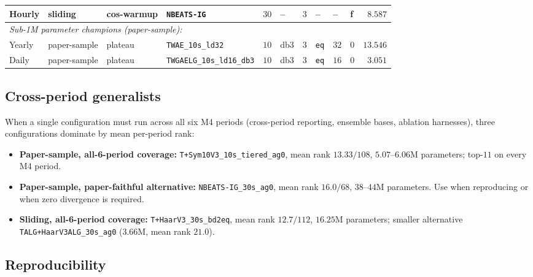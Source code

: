 \documentclass{article}
\begin{document}
\begin{table}[h]
\begin{tabular}{@{}llllllllllr@{}}
Hourly    & sliding      & cos-warmup & \texttt{NBEATS-IG}                  & $30$ & --    & $3$ & --             & --   & f & $\phantom{0}8.587$ \\
\midrule
\multicolumn{11}{l}{\textit{Sub-1M parameter champions (paper-sample):}} \\
Yearly    & paper-sample & plateau & \texttt{TWAE\_10s\_ld32}             & $10$ & db3   & $3$ & \texttt{eq} & $32$ & 0 & $13.546$ \\
Daily     & paper-sample & plateau & \texttt{TWGAELG\_10s\_ld16\_db3}     & $10$ & db3   & $3$ & \texttt{eq} & $16$ & 0 & $\phantom{0}3.051$ \\
\bottomrule
\end{tabular}
\end{table}

\subsection{Cross-period generalists}
\label{app:hyperparams:generalist}

When a single configuration must run across all six M4 periods (cross-period reporting, ensemble bases, ablation harnesses), three configurations dominate by mean per-period rank:

\begin{itemize}\itemsep -1pt
\item \textbf{Paper-sample, all-6-period coverage:} \texttt{T+Sym10V3\_10s\_tiered\_ag0}, mean rank $13.33/108$, $5.07$--$6.06$M parameters; top-$11$ on every M4 period.
\item \textbf{Paper-sample, paper-faithful alternative:} \texttt{NBEATS-IG\_30s\_ag0}, mean rank $16.0/68$, $38$--$44$M parameters. Use when reproducing \citet{oreshkin2020nbeats} or when zero divergence is required.
\item \textbf{Sliding, all-6-period coverage:} \texttt{T+HaarV3\_30s\_bd2eq}, mean rank $12.7/112$, $16.25$M parameters; smaller alternative \texttt{TALG+HaarV3ALG\_30s\_ag0} ($3.66$M, mean rank $21.0$).
\end{itemize}

\subsection{Reproducibility}
\label{app:hyperparams:repro}
\end{document}
